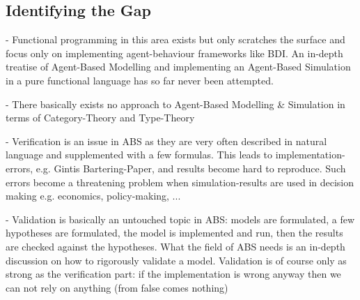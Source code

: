 \subsection{Identifying the Gap}
- Functional programming in this area exists but only scratches the surface and focus only on implementing agent-behaviour frameworks like BDI. An in-depth treatise of Agent-Based Modelling and implementing an Agent-Based Simulation in a pure functional language has so far never been attempted.

- There basically exists no approach to Agent-Based Modelling \& Simulation in terms of Category-Theory and Type-Theory

- Verification is an issue in ABS as they are very often described in natural language and supplemented with a few formulas. This leads to implementation-errors, e.g. Gintis Bartering-Paper, and results become hard to reproduce. Such errors become a threatening problem when simulation-results are used in decision making e.g. economics, policy-making, ...

- Validation is basically an untouched topic in ABS: models are formulated, a few hypotheses are formulated, the model is implemented and run, then the results are checked against the hypotheses. What the field of ABS needs is an in-depth discussion on how to rigorously validate a model. Validation is of course only as strong as the verification part: if the implementation is wrong anyway then we can not rely on anything (from false comes nothing)